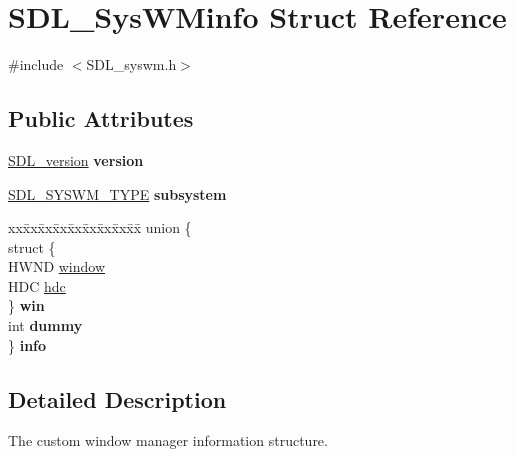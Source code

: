 \hypertarget{struct_s_d_l___sys_w_minfo}{}\section{S\+D\+L\+\_\+\+Sys\+W\+Minfo Struct Reference}
\label{struct_s_d_l___sys_w_minfo}


{\ttfamily \#include $<$S\+D\+L\+\_\+syswm.\+h$>$}

\subsection*{Public Attributes}
\begin{DoxyCompactItemize}
\item 
\mbox{\label{struct_s_d_l___sys_w_minfo_ac3a70af022d4849e9ff546595e94627f}} 
\hyperlink{struct_s_d_l__version}{S\+D\+L\+\_\+version} {\bfseries version}
\item 
\mbox{\label{struct_s_d_l___sys_w_minfo_a438b6a06ab3ee417293c7b7fc5a23855}} 
\hyperlink{_s_d_l__syswm_8h_a064c26598287280fff2a00d6758ac4f7}{S\+D\+L\+\_\+\+S\+Y\+S\+W\+M\+\_\+\+T\+Y\+PE} {\bfseries subsystem}
\item 
\mbox{\label{struct_s_d_l___sys_w_minfo_a96639a5304141225509483baf5910439}} 
\begin{tabbing}
xx\=xx\=xx\=xx\=xx\=xx\=xx\=xx\=xx\=\kill
union \{\\
\>struct \{\\
\>\>HWND \hyperlink{struct_s_d_l___sys_w_minfo_af06225591ff07e837bbd037728a525b9}{window}\\
\>\>HDC \hyperlink{struct_s_d_l___sys_w_minfo_a5c9d0745b083422834681e99c38b803e}{hdc}\\
\>\} {\bfseries win}\\
\>int {\bfseries dummy}\\
\} {\bfseries info}\\

\end{tabbing}\end{DoxyCompactItemize}


\subsection{Detailed Description}
The custom window manager information structure.

